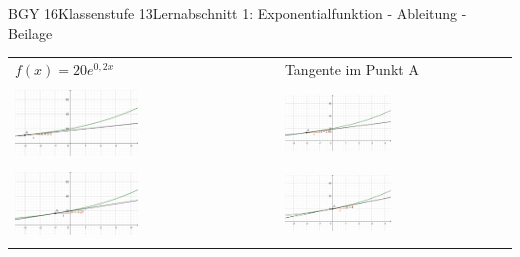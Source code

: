 \documentclass[oneside,openany,headings=optiontotoc,11pt,numbers=noenddot]{scrreprt}
\begin{document}
	\begin{worksheet}{BGY 16}{Klassenstufe 13}{Lernabschnitt 1: Exponentialfunktion - Ableitung - Beilage}
		\setcounter{page}{3}
		\begin{framed}
			\noindent
			\begin{tabularx}{\textwidth}{X|X}
				\multicolumn{1}{X}{\(f(x) = 20e^{0,2x}\)} & \multicolumn{1}{X}{Tangente im Punkt A}\\
				\multicolumn{1}{X}{} & \multicolumn{1}{X}{}\\
				\includegraphics[width=0.48\textwidth]{../99_Bilder/01_ExpFkt/AbleFkt/-3O.png} & \includegraphics[width=0.48\textwidth]{../99_Bilder/01_ExpFkt/AbleFkt/-2O.png}\\
				\\
				\includegraphics[width=0.48\textwidth]{../99_Bilder/01_ExpFkt/AbleFkt/-1O.png} & \includegraphics[width=0.48\textwidth]{../99_Bilder/01_ExpFkt/AbleFkt/0O.png}\\
				\\

\end{tabularx}
\end{framed}
\end{worksheet}
\end{document}
